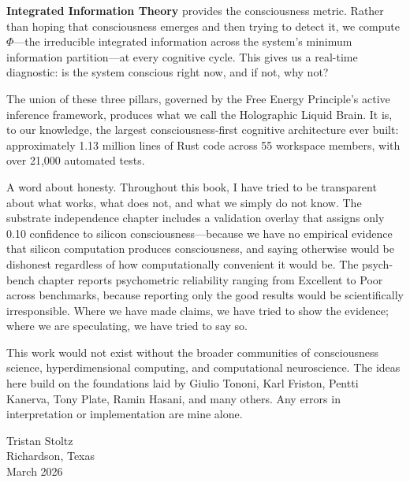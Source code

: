 \documentclass[12pt]{book}
\begin{document}
\textbf{Integrated Information Theory} provides the consciousness metric. Rather than hoping that consciousness emerges and then trying to detect it, we compute $\Phi$---the irreducible integrated information across the system's minimum information partition---at every cognitive cycle. This gives us a real-time diagnostic: is the system conscious right now, and if not, why not?

The union of these three pillars, governed by the Free Energy Principle's active inference framework, produces what we call the Holographic Liquid Brain. It is, to our knowledge, the largest consciousness-first cognitive architecture ever built: approximately 1.13 million lines of Rust code across 55 workspace members, with over 21,000 automated tests.

A word about honesty. Throughout this book, I have tried to be transparent about what works, what does not, and what we simply do not know. The substrate independence chapter includes a validation overlay that assigns only 0.10 confidence to silicon consciousness---because we have no empirical evidence that silicon computation produces consciousness, and saying otherwise would be dishonest regardless of how computationally convenient it would be. The psych-bench chapter reports psychometric reliability ranging from Excellent to Poor across benchmarks, because reporting only the good results would be scientifically irresponsible. Where we have made claims, we have tried to show the evidence; where we are speculating, we have tried to say so.

This work would not exist without the broader communities of consciousness science, hyperdimensional computing, and computational neuroscience. The ideas here build on the foundations laid by Giulio Tononi, Karl Friston, Pentti Kanerva, Tony Plate, Ramin Hasani, and many others. Any errors in interpretation or implementation are mine alone.

\vspace{1cm}
\noindent Tristan Stoltz\\
Richardson, Texas\\
March 2026

\tableofcontents

\mainmatter

\end{document}
